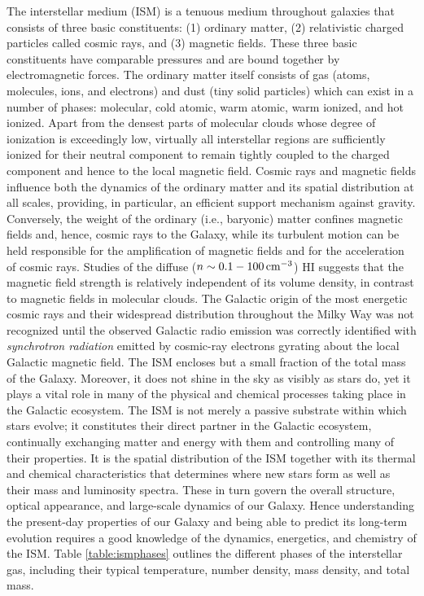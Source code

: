 \documentclass[a4paper,10pt]{article}
\begin{document}
The interstellar medium (ISM) is a tenuous medium throughout galaxies that consists of three basic constituents: (1) ordinary matter, (2) relativistic charged particles called cosmic rays, and (3) magnetic fields. These three basic constituents have comparable pressures and are bound together by electromagnetic forces. The ordinary matter itself consists of gas (atoms, molecules, ions, and electrons) and dust (tiny solid particles) which can exist in a number of phases: molecular, cold atomic, warm atomic, warm ionized, and hot ionized. Apart from the densest parts of molecular clouds whose degree of ionization is exceedingly low, virtually all interstellar regions are sufficiently ionized for their neutral component to remain tightly coupled to the charged component and hence to the local magnetic field. Cosmic rays and magnetic fields influence both the dynamics of the ordinary matter and its spatial distribution at all scales, providing, in particular, an efficient support mechanism against gravity. Conversely, the weight of the ordinary (i.e., baryonic) matter confines magnetic fields and, hence, cosmic rays to the Galaxy, while its turbulent motion can be held responsible for the amplification of magnetic fields and for the acceleration of cosmic rays. Studies of the diffuse ($n\sim0.1-100\,{\rm cm^{-3}}$) HI suggests that the magnetic field strength is relatively independent of its volume density, in contrast to magnetic fields in molecular clouds. The Galactic origin of the most energetic cosmic rays and their widespread distribution throughout the Milky Way was not recognized until the observed Galactic radio emission was correctly identified with \textit{synchrotron radiation} emitted by cosmic-ray electrons gyrating about the local Galactic magnetic field. The ISM encloses but a small fraction of the total mass of the Galaxy. Moreover, it does not shine in the sky as visibly as stars do, yet it plays a vital role in many of the physical and chemical processes taking place in the Galactic ecosystem. The ISM is not merely a passive substrate within which stars evolve; it constitutes their direct partner in the Galactic ecosystem, continually exchanging matter and energy with them and controlling many of their properties. It is the spatial distribution of the ISM together with its thermal and chemical characteristics that determines where new stars form as well as their mass and luminosity spectra. These in turn govern the overall structure, optical appearance, and large-scale dynamics of our Galaxy. Hence understanding the present-day properties of our Galaxy and being able to predict its long-term evolution requires a good knowledge of the dynamics, energetics, and chemistry of the ISM. Table \ref{table:ismphases} outlines the different phases of the interstellar gas, including their typical temperature, number density, mass density, and total mass.
\end{document}
